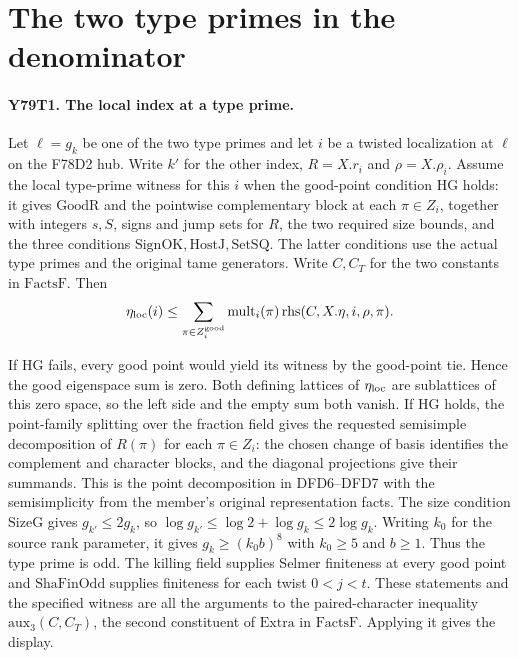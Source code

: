 \section{The two type primes in the denominator}

\paragraph{Y79T1. The local index at a type prime.}
Let $\ell=g_k$ be one of the two type primes and let $i$ be a twisted
localization at $\ell$ on the F78D2 hub. Write $k'$ for the other
index, $R=X.r_i$ and $\rho=X.\rho_i$. Assume the local type-prime
witness for this $i$ when the good-point condition $\mathrm{HG}$ holds:
it gives $\mathrm{GoodR}$ and the pointwise complementary block at
each $\pi\in Z_i$, together with integers $s,S$, signs and jump
sets for $R$, the two required size bounds, and the three conditions
$\mathrm{SignOK},\mathrm{HostJ},\mathrm{SetSQ}$.
The latter conditions use the actual type primes and the original
tame generators. Write $C,C_T$ for the two constants in
$\mathrm{FactsF}$. Then
\[
 \eta_{\rm loc}(i)\le
 \sum_{\pi\in Z_i^{\rm good}}\mathrm{mult}_i(\pi)
                    \,\mathrm{rhs}(C,X.\eta,i,\rho,\pi).
\]

If $\mathrm{HG}$ fails, every good point would yield its witness
by the good-point tie. Hence the good eigenspace sum is zero.
Both defining lattices of $\eta_{\rm loc}$ are sublattices of
this zero space, so the left side and the empty sum both vanish.
If $\mathrm{HG}$ holds, the point-family splitting over the fraction
field gives the requested semisimple decomposition of $R(\pi)$
for each $\pi\in Z_i$: the chosen change of basis identifies
the complement and character blocks, and the diagonal projections
give their summands. This is the point decomposition in DFD6--DFD7
with the semisimplicity from the member's original representation facts.
The size condition $\mathrm{SizeG}$ gives $g_{k'}\le2g_k$, so
$\log g_{k'}\le\log2+\log g_k\le2\log g_k$.
Writing $k_0$ for the source rank parameter, it gives
$g_k\ge(k_0 b)^8$ with $k_0\ge5$ and $b\ge1$.
Thus the type prime is odd. The killing field supplies Selmer
finiteness at every good point and $\mathrm{ShaFinOdd}$ supplies
finiteness for each twist $0<j<t$. These statements and the
specified witness are all the arguments to the paired-character
inequality $\mathrm{aux}_3(C,C_T)$, the second constituent of
$\mathrm{Extra}$ in $\mathrm{FactsF}$. Applying it gives the display.

